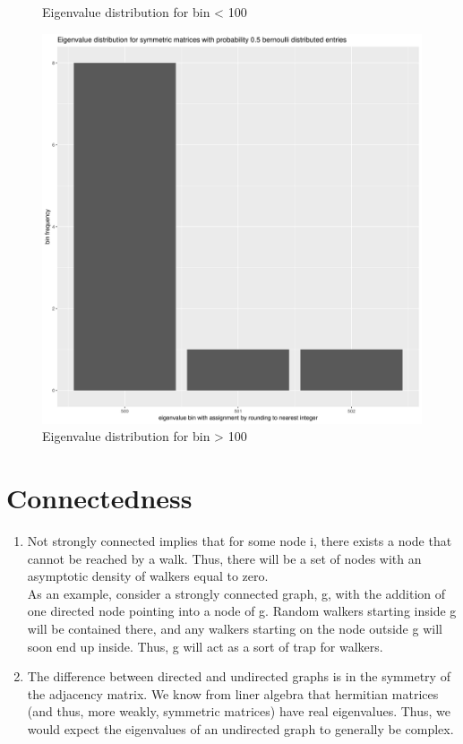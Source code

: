 \documentclass[a4paper]{article}
\begin{document}
\begin{enumerate}[label={(2. \alph*)}]
\begin{figure}
            \caption{Eigenvalue distribution for bin < 100}
            \label{fig:eig_dist_small}
        \end{figure}
        \begin{figure}
            \includegraphics[width=\linewidth]{./eig_dist_big.png}
            \caption{Eigenvalue distribution for bin > 100}
            \label{fig:eig_dist_big}
        \end{figure}

\end{enumerate}

\pagebreak

\section{Connectedness} 

\begin{enumerate}[label={(3. \alph*)}]
    \item
        Not strongly connected implies that for some node i, there exists a node that cannot be reached by a walk. Thus, there will be a set of nodes with an asymptotic density of walkers equal to zero. \\As an example, consider a strongly connected graph, g, with the addition of one directed node pointing into a node of g. Random walkers starting inside g will be contained there, and any walkers starting on the node outside g will soon end up inside. Thus, g will act as a sort of trap for walkers.
    \item
        The difference between directed and undirected graphs is in the symmetry of the adjacency matrix. We know from liner algebra that hermitian matrices (and thus, more weakly, symmetric matrices) have real eigenvalues. Thus, we would expect the eigenvalues of an undirected graph to generally be complex.
\end{enumerate}
\end{document}
